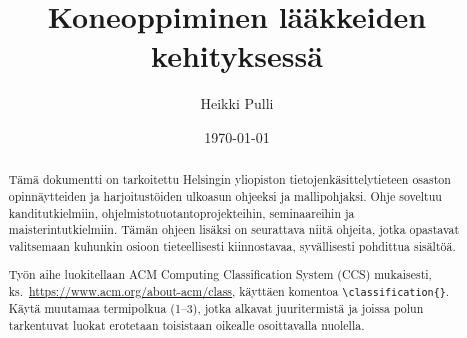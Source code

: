 \documentclass[finnish,twoside,censored,tkt,sw-line]{HYthesisML}
\title{Koneoppiminen lääkkeiden kehityksessä}
\author{Heikki Pulli}
\date{\today}
\begin{document}
\maketitle



\begin{abstract}

    Tämä dokumentti on tarkoitettu Helsingin yliopiston tietojenkäsittelytieteen osaston opin\-näyt\-teiden ja harjoitustöiden ulkoasun ohjeeksi ja mallipohjaksi. Ohje soveltuu kanditutkielmiin, ohjelmistotuotantoprojekteihin, seminaareihin ja maisterintutkielmiin. Tämän ohjeen lisäksi on seurattava niitä ohjeita, jotka opastavat valitsemaan kuhunkin osioon tieteellisesti kiinnostavaa, syvällisesti pohdittua sisältöä.


    Työn aihe luokitellaan
    ACM Computing Classification System (CCS) mukaisesti,
    ks.\ \url{https://www.acm.org/about-acm/class},
    käyttäen komentoa \verb+\classification{}+.
    Käytä muutamaa termipolkua (1--3), jotka alkavat juuritermistä ja joissa polun tarkentuvat luokat erotetaan toisistaan oikealle osoittavalla nuolella.

\end{abstract}


\end{document}
